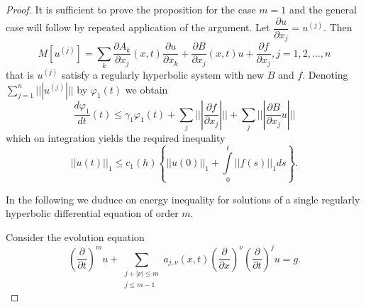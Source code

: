 \begin{proof}
It is sufficient to prove the proposition for the case $m=1$ and the
general case will follow by repeated application of the argument. Let
$\dfrac{\partial u}{\partial x_j} = u^{(j)}$. Then 
$$
M[u^{(j)}] = \sum_k \frac{\partial A_{k}}{\partial x_{j}}(x,t)
\frac{\partial u}{\partial x_{k}} + \frac{\partial B}{\partial x_{j}}
(x,t) u + \frac{\partial f}{\partial x_{j}}, j = 1,2, \ldots,n 
$$
that is $u^{(j)}$ satisfy a regularly hyperbolic system with new $B$ and $f$.
Denoting\pageoriginale $\sum\limits^n_{j=1} ||| u^{(j)} |||$ by
$\varphi_1(t)$ we obtain  
$$
\frac{d \varphi_1}{dt}(t)\leq \gamma_1 \varphi_1 (t) + \sum\limits_j |||
\frac{\partial f}{ \partial x_j} ||| +\sum\limits_j  ||| \frac{\partial
  B}{\partial x_j}u||| 
$$
which on integration yields the required inequality 
$$
|| u (t) ||_1 \leq c_1 (h) \left\{ || u(0)||_1 + \int\limits^t_0 ||
f(s)||_1 ds\right\}. 
$$

In the following we duduce on energy inequality for solutions of a
single regularly hyperbolic differential equation of order $m$.  

Consider the evolution equation
\begin{equation}
\left(\frac{\partial}{\partial t}\right)^m u + \sum_{\substack{j+| \nu| \leq
      m\\j\leq m-1}} a_{j,\nu}(x,t)\left(\frac{\partial}{ \partial
  x}\right)^\nu   \left(\frac{\partial}{\partial t}\right)^j
u=g. \tag{6.12} \label{chap3-eq6.12} 
\end{equation}


\end{proof}
